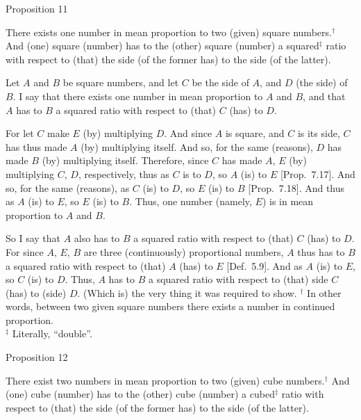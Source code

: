 
\begin{center}
{\large Proposition 11}
\end{center}

There exists one number in mean proportion to two (given) square numbers.$^\dag$ And (one)  square (number) has to the
(other) square (number) a squared$^\ddag$ ratio with respect to (that) the side (of the former
has) to the side (of the latter).

\epsfysize=1.2in
\centerline{}

Let $A$ and $B$ be square numbers, and let $C$ be the side of $A$, and
$D$ (the side) of $B$. I say that there exists one number in mean proportion
to $A$ and $B$, and that $A$ has to $B$ a squared ratio with respect to
(that) $C$ (has) to $D$.

For let $C$ make $E$ (by) multiplying $D$. And since $A$ is square, and $C$ is its side, $C$ has thus made $A$ (by) multiplying
itself. And so, for the same (reasons), $D$ has made $B$ (by) multiplying
itself. Therefore, since $C$ has made  $A$, $E$ (by) multiplying
$C$, $D$, respectively, thus as $C$ is to $D$, so $A$ (is) to $E$ [Prop.~7.17]. And so, for the same (reasons), 
as $C$ (is) to $D$, so $E$ (is) to $B$  [Prop.~7.18]. And thus as $A$ (is) to $E$, so
$E$ (is) to $B$. Thus,  one  number (namely, $E$) is in mean proportion to $A$ and $B$.

So I say that $A$ also has to $B$ a squared ratio with respect to (that)
$C$ (has) to $D$. For since $A$, $E$, $B$ are  three (continuously) proportional numbers, $A$ thus has to $B$ a squared ratio with
respect to (that) $A$ (has) to $E$ [Def.~5.9]. And
as $A$ (is) to $E$, so $C$ (is) to $D$. Thus, $A$ has to $B$ a squared ratio
with respect to (that) side $C$ (has) to (side) $D$. (Which is) the very thing it
was required to show.
{\footnotesize\noindent$^\dag$ In other words, between two given square numbers there
exists a number in continued proportion.\\[0.5ex]
$^\ddag$ Literally, ``double''.}


\begin{center}
{\large Proposition 12}
\end{center}

There exist two numbers in mean proportion to two (given) cube numbers.$^\dag$ And  (one) cube (number)
has to the (other) cube (number) a cubed$^\ddag$ ratio
with respect to (that) the side (of the former has) to the side (of the latter).

